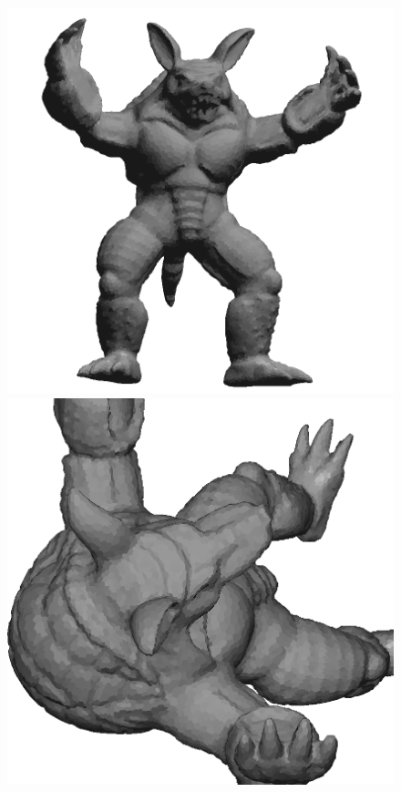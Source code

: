\begin{figure}[!h]
    \centering
    \centering
    \includegraphics[scale=0.3]{images/armadillo-extendfs.png}
    \endminipage\hfill
    \centering
    \includegraphics[scale=0.3]{images/armadillo-extendfs-1.png}

\end{figure}
